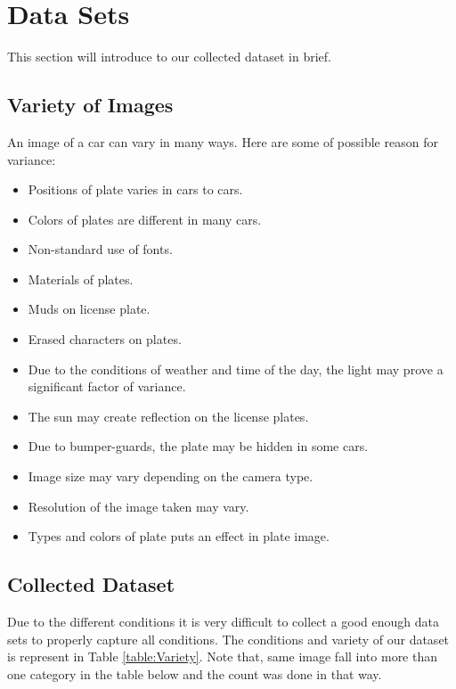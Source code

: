\documentclass{standalone}
\begin{document}
\chapter{Data Sets}
This section will introduce to our collected dataset in brief. 

\section{Variety of Images}
An image of a car can vary in many ways. Here are some of possible reason for variance:
\begin{itemize}
    \item Positions of plate varies in cars to cars.
    \item Colors of plates are different in many cars.
    \item Non-standard use of fonts.
    \item Materials of plates.
    \item Muds on license plate.
    \item Erased characters on plates.
    \item Due to the conditions of weather and time of the day, the light may prove a significant factor of variance. 
    \item The sun may create reflection on the license plates.
    \item Due to bumper-guards, the plate may be hidden in some cars.
    \item Image size may vary depending on the camera type.
    \item Resolution of the image taken may vary.
    \item Types and colors of plate puts an effect in plate image.
\end{itemize}

\section{Collected Dataset}
Due to the different conditions it is very difficult to collect a good enough data sets to properly capture all conditions. The conditions and variety of our dataset is represent in Table \ref{table:Variety}. Note that, same image fall into more than one category in the table below and the count was done in that way. 
\end{document}
